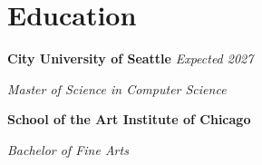 \documentclass[10pt,letterpaper]{article}
\newcommand{\entry}[3]{%
  \noindent\textbf{\color{accentcolor}#1} \hfill \textit{#3} \quad \quad \textit{#2}\par
}
\newcommand{\role}[2]{%
  \noindent\textit{#1}\par
  \vspace{0.2em}
}
\begin{document}
\section{Education}

\entry{City University of Seattle}{Expected 2027}{}
\role{Master of Science in Computer Science}{}

\vspace{0.4em}
\entry{School of the Art Institute of Chicago}{}{}
\role{Bachelor of Fine Arts}{}
\end{document}

